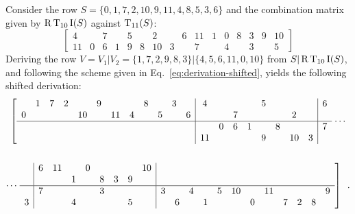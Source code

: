 \begin{example}
    \cite[216]{Starr1984}
    \label{ex:derivation-shifted}
    Consider the row $S = \{ 0, 1, 7, 2, 10, 9, 11, 4, 8, 5, 3, 6 \}$ and the combination matrix given by $\operatorname{R}\operatorname{T}_{10}\operatorname{I}(S)$ against $\operatorname{T}_{11}(S)$:
    \begin{equation}
        \left[
        \begin{array}{cccccccc|cccccccc}
            4 && 7 && 5 && 2 && 6 & 11 & 1 & 0 & 8 & 3 & 9 & 10 \\
            11 & 0 & 6 & 1 & 9 & 8 & 10 & 3 && 7 && 4 && 3 && 5
        \end{array}
        \right]
    \end{equation}
    Deriving the row $V = V_1 | V_2 = \{ 1, 7, 2, 9, 8, 3 \} | \{ 4, 5, 6, 11, 0, 10 \}$ from $S | \operatorname{R}\operatorname{T}_{10}\operatorname{I}(S)$, and following the scheme given in Eq.~\ref{eq:derivation-shifted}, yields the following shifted derivation:
    \begin{multline}
        \left[
        \begin{array}{cccccccccccc|cccccccc|c}
            & 1 & 7 & 2 && 9 &&& 8 && 3 && 4 &&&& 5 &&&& 6 \\
            0 &&&& 10 && 11 & 4 && 5 && 6 & && 7 &&&& 2 && \\
            \hline
            &&&&&&&&&&&& & 0 & 6 & 1 && 8 &&& 7 \\
            &&&&&&&&&&&& 11 &&&& 9 && 10 & 3 &
        \end{array}
        \right. \cdots \\\\
        \cdots \left. \begin{array}{c|cccccccc|cccccccccccc}
            & 6 & 11 && 0 &&&& 10 &&&&&&&&&&& \\
            & && 1 && 8 & 3 & 9 & &&&&&&&&&&& \\
            \hline
            & 7 &&&& 3 &&& & 3 && 4 && 5 & 10 && 11 &&&& 9 \\
            3 &&& 4 &&&& 5 & && 6 && 1 &&& 0 && 7 & 2 & 8
        \end{array} \right] \enspace.
    \end{multline}
\end{example}

\vspace{12pt}

